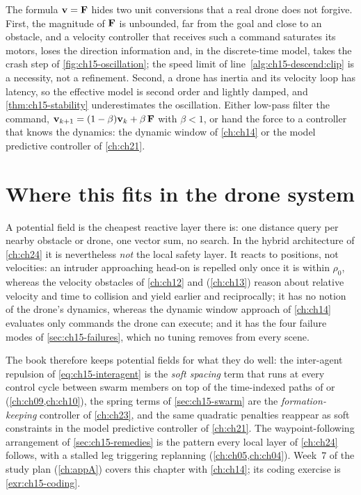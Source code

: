 \begin{pitfall}
The formula $\mathbf{v} = \mathbf{F}$ hides two unit conversions that a real drone
does not forgive. First, the magnitude of $\mathbf{F}$ is unbounded, far from
the goal and close to an obstacle, and a velocity controller that receives
such a command saturates its motors, loses the direction information and,
in the discrete-time model, takes the crash step of
\cref{fig:ch15-oscillation}; the speed limit of
line~\ref{alg:ch15-descend:clip} is a necessity, not a refinement. Second,
a drone has inertia and its velocity loop has latency, so the effective
model is second order and lightly damped, and \cref{thm:ch15-stability}
underestimates the oscillation. Either low-pass filter the command,
$\mathbf{v}_{k+1} = (1 - \beta)\mathbf{v}_k + \beta\,\mathbf{F}$ with $\beta < 1$, or hand
the force to a controller that knows the dynamics: the dynamic window of \cref{ch:ch14} or the model predictive
controller of \cref{ch:ch21}.
\end{pitfall}

\section{Where this fits in the drone system}
\label{sec:ch15-drone}

\begin{dronebox}
A potential field is the cheapest reactive layer there is: one distance
query per nearby obstacle or drone, one vector sum, no search. In the hybrid
architecture of \cref{ch:ch24} it is nevertheless \emph{not} the local safety
layer. It reacts to positions, not velocities: an intruder approaching
head-on is repelled only once it is within $\rho_0$, whereas the velocity
obstacles of \cref{ch:ch12} and \orca (\cref{ch:ch13}) reason about relative
velocity and time to collision and yield earlier and reciprocally; it has no
notion of the drone's dynamics, whereas the dynamic window approach of
\cref{ch:ch14} evaluates only commands the drone can execute; and it has the
four failure modes of \cref{sec:ch15-failures}, which no tuning removes from
every scene.

The book therefore keeps potential fields for what they do well: the
inter-agent repulsion of \cref{eq:ch15-interagent} is the \emph{soft
spacing} term that runs at every control cycle between swarm members on top
of the time-indexed paths of \cbs or \ecbs (\cref{ch:ch09,ch:ch10}), the
spring terms of \cref{sec:ch15-swarm} are the \emph{formation-keeping}
controller of \cref{ch:ch23}, and the same quadratic penalties reappear as
soft constraints in the model predictive controller of \cref{ch:ch21}. The
waypoint-following arrangement of \cref{sec:ch15-remedies} is the pattern
every local layer of \cref{ch:ch24} follows, with a stalled leg triggering
replanning (\cref{ch:ch05,ch:ch04}). Week~7 of the study plan
(\cref{ch:appA}) covers this chapter with \cref{ch:ch14}; its coding exercise
is \cref{exr:ch15-coding}.
\end{dronebox}

